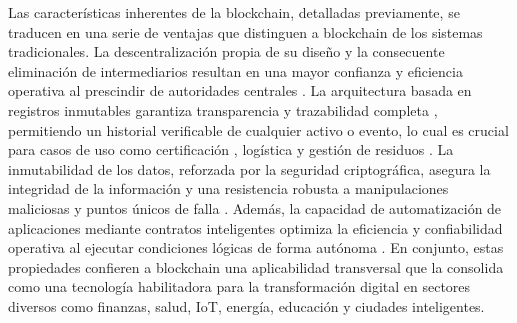 
Las características inherentes de la blockchain, detalladas previamente, se traducen en una serie de ventajas que distinguen a blockchain de los sistemas tradicionales. La descentralización propia de su diseño y la consecuente eliminación de intermediarios resultan en una mayor confianza \cite{rejeb2023role} y eficiencia operativa al prescindir de autoridades centrales \cite{sharabati2024blockchain}. La arquitectura basada en registros inmutables garantiza transparencia y trazabilidad completa \cite{sharabati2024blockchain}, permitiendo un historial verificable de cualquier activo o evento, lo cual es crucial para casos de uso como certificación \cite{bartolomeo2020introduccion}, logística \cite{bartolomeo2020introduccion, rejeb2023role} y gestión de residuos \cite{bulkowska2023implementation}. La inmutabilidad de los datos, reforzada por la seguridad criptográfica, asegura la integridad de la información \cite{sunny2022systematic} y una resistencia robusta a manipulaciones maliciosas y puntos únicos de falla \cite{bartolomeo2020introduccion}. Además, la capacidad de automatización de aplicaciones mediante contratos inteligentes optimiza la eficiencia y confiabilidad operativa al ejecutar condiciones lógicas de forma autónoma \cite{bartolomeo2020introduccion}. En conjunto, estas propiedades confieren a blockchain una aplicabilidad transversal que la consolida como una tecnología habilitadora para la transformación digital en sectores diversos como finanzas, salud, IoT, energía, educación y ciudades inteligentes.

